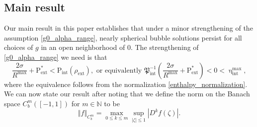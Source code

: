 \documentclass[11pt,reqno]{amsart}
\numberwithin{equation}{section}
\providecommand{\abs}[1]{\left\vert#1\right\vert}
\providecommand{\norm}[1]{\left\Vert#1\right\Vert}
\providecommand{\abs}[1]{\left\vert#1\right\vert}
\providecommand{\norm}[1]{\left\Vert#1\right\Vert}
\newcommand{\m}{\mathrm}
\def\pint{\m{P}_{\m{int}}}
\def\pfint{\mathfrak{P}_{\m{int}}}
\def\hint{\upeta_{\m{int}}}
\def\pext{\m{P}_{\m{ext}}}
\def\N{\mathbb{N}}
\begin{document}
\subsection{Main result}

Our main result in this paper establishes that under a minor strengthening of the assumption \eqref{g0_alpha_range}, nearly spherical bubble solutions persist for all choices of $g$ in an open neighborhood of $0$.  The strengthening of \eqref{g0_alpha_range} we need is that 
\begin{equation}\label{necessary_condition}
 \frac{2\sigma}{R^{\m{max}}} + \pext^\ast < \pint(\rho_{\m{ext}}), \text{ or equivalently }  \pfint^{-1}\left(\frac{2\sigma}{R^{\m{max}}} + \pext^\ast\right) < 0 < \hint^{\m{max}},
\end{equation}
where the equivalence follows from the normalization \eqref{enthalpy_normalization}.  We can now state our result after noting that we define the norm on the Banach space $C^m_b([-1,1])$ for $m \in \N$ to be 
\begin{equation}
 \norm{f}_{C^m_b} = \max_{0\le k \le m} \sup_{\abs{\zeta} \le 1} \abs{D^k f(\zeta)}.
\end{equation}
\end{document}
